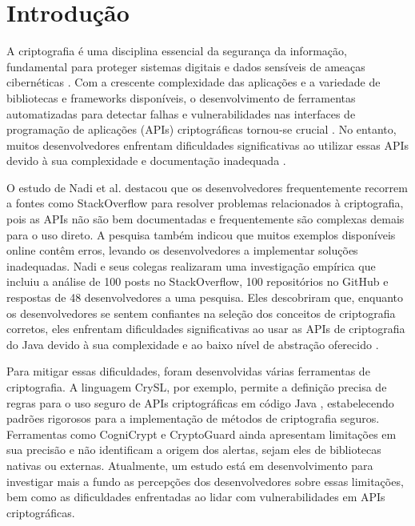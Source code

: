 \section{Introdução}

A criptografia é uma disciplina essencial da segurança da informação, fundamental para proteger sistemas digitais e dados sensíveis de ameaças cibernéticas \cite{what_is_cryptography}. Com a crescente complexidade das aplicações e a variedade de bibliotecas e frameworks disponíveis, o desenvolvimento de ferramentas automatizadas para detectar falhas e vulnerabilidades nas interfaces de programação de aplicações (APIs) criptográficas tornou-se crucial \cite{api_misuses_zhang}. No entanto, muitos desenvolvedores enfrentam dificuldades significativas ao utilizar essas APIs devido à sua complexidade e documentação inadequada \cite{nadi_icse_2016}.

O estudo de Nadi et al. \cite{nadi_icse_2016} destacou que os desenvolvedores frequentemente recorrem a fontes como StackOverflow para resolver problemas relacionados à criptografia, pois as APIs não são bem documentadas e frequentemente são complexas demais para o uso direto. A pesquisa também indicou que muitos exemplos disponíveis online contêm erros, levando os desenvolvedores a implementar soluções inadequadas. Nadi e seus colegas realizaram uma investigação empírica que incluiu a análise de 100 posts no StackOverflow, 100 repositórios no GitHub e respostas de 48 desenvolvedores a uma pesquisa. Eles descobriram que, enquanto os desenvolvedores se sentem confiantes na seleção dos conceitos de criptografia corretos, eles enfrentam dificuldades significativas ao usar as APIs de criptografia do Java devido à sua complexidade e ao baixo nível de abstração oferecido \cite{nadi_icse_2016}.

Para mitigar essas dificuldades, foram desenvolvidas várias ferramentas de criptografia. A linguagem CrySL, por exemplo, permite a definição precisa de regras para o uso seguro de APIs criptográficas em código Java \cite{CogniCrypt}, estabelecendo padrões rigorosos para a implementação de métodos de criptografia seguros. Ferramentas como CogniCrypt e CryptoGuard ainda apresentam limitações em sua precisão e não identificam a origem dos alertas, sejam eles de bibliotecas nativas ou externas. Atualmente, um estudo está em desenvolvimento para investigar mais a fundo as percepções dos desenvolvedores sobre essas limitações, bem como as dificuldades enfrentadas ao lidar com vulnerabilidades em APIs criptográficas.

